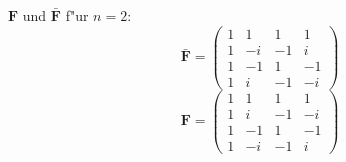 \documentclass[german, 10pt, a4paper, twocolumn]{scrartcl}
\begin{document}
$\mathbf{F}$ und $\mathbf{\bar{F}}$ f"ur $n=2$:
\begin{displaymath}
	\mathbf{\bar{F}} =
	\left (
	\begin{array}{cccc}
		1 &	1 &	1 &	1\\
		1 &	-i &	-1 &	i\\
		1 &	-1 &	1 &	-1\\
		1 &	i &	-1 &	-i
	\end{array}
	\right )
\end{displaymath}
\begin{displaymath}
	\mathbf{F} =
	\left (
	\begin{array}{cccc}
		1 &	1 &	1 &	1\\
		1 &	i &	-1 &	-i\\
		1 &	-1 &	1 &	-1\\
		1 &	-i &	-1 &	i
	\end{array}
	\right )
\end{displaymath}

\end{document}
